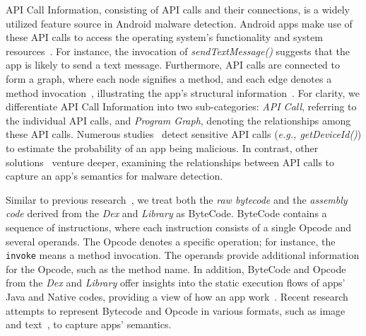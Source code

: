 API Call Information, consisting of API calls and their connections, is a widely utilized feature source in Android malware detection.
Android apps make use of these API calls to access the operating system's functionality and system resources~\cite{peiravian2013machine}.
For instance, the invocation of \textit{sendTextMessage()} suggests that the app is likely to send a text message.
Furthermore, API calls are connected to form a graph, where each node signifies a method, and each edge denotes a method invocation~\cite{li2023black}, illustrating the app's structural information~\cite{wu2019malscan}.
For clarity, we differentiate API Call Information into two sub-categories: \textit{API Call}, referring to the individual API calls, and \textit{Program Graph}, denoting the relationships among these API calls.
Numerous studies~\cite{arp2014drebin,kim2018multimodal,wu2021android} detect sensitive API calls (\textit{e.g., getDeviceId()}) to estimate the probability of an app being malicious.
In contrast, other solutions~\cite{wu2019malscan,he2022msdroid,hou2017hindroid,xu2020sdac,martin2017evolving,ye2019out} venture deeper, examining the relationships between API calls to capture an app's semantics for malware detection.

Similar to previous research~\cite{xu2018deeprefiner,sun2016taintart,li2021palmtree,daoudi2021dexray}, we treat both the \textit{raw bytecode} and the \textit{assembly code} derived from the \textit{Dex} and \textit{Library} as ByteCode.
ByteCode contains a sequence of instructions, where each instruction consists of a single Opcode and several operands.
The Opcode denotes a specific operation; for instance, the \texttt{invoke} means a method invocation.
The operands provide additional information for the Opcode, such as the method name.
In addition, ByteCode and Opcode from the \textit{Dex} and \textit{Library} offer insights into the static execution flows of apps' Java and Native codes, providing a view of how an app work~\cite{kim2018multimodal}.
Recent research attempts to represent Bytecode and Opcode in various formats, such as image~\cite{mclaughlin2017deep,hsien2018r2,amin2022android,xiao2019image} and text~\cite{xu2018deeprefiner,yan2018lstm,karbab2021petadroid}, to capture apps' semantics.

